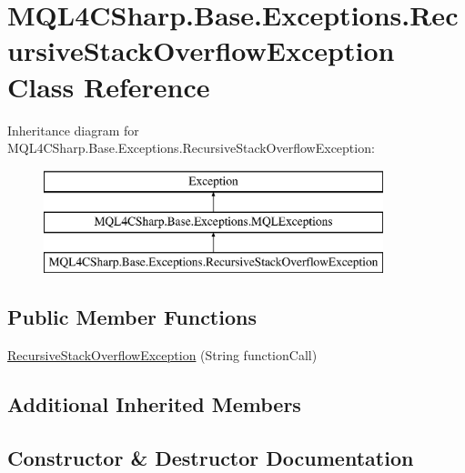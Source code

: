 \hypertarget{class_m_q_l4_c_sharp_1_1_base_1_1_exceptions_1_1_recursive_stack_overflow_exception}{}\section{M\+Q\+L4\+C\+Sharp.\+Base.\+Exceptions.\+Recursive\+Stack\+Overflow\+Exception Class Reference}
\label{class_m_q_l4_c_sharp_1_1_base_1_1_exceptions_1_1_recursive_stack_overflow_exception}
Inheritance diagram for M\+Q\+L4\+C\+Sharp.\+Base.\+Exceptions.\+Recursive\+Stack\+Overflow\+Exception\+:\begin{figure}[H]
\begin{center}
\leavevmode
\includegraphics[height=3.000000cm]{class_m_q_l4_c_sharp_1_1_base_1_1_exceptions_1_1_recursive_stack_overflow_exception}
\end{center}
\end{figure}
\subsection*{Public Member Functions}
\begin{DoxyCompactItemize}
\item 
\hyperlink{class_m_q_l4_c_sharp_1_1_base_1_1_exceptions_1_1_recursive_stack_overflow_exception_ad13f3f1e5900e0c9ae779254a5977a0a}{Recursive\+Stack\+Overflow\+Exception} (String function\+Call)
\end{DoxyCompactItemize}
\subsection*{Additional Inherited Members}


\subsection{Constructor \& Destructor Documentation}
